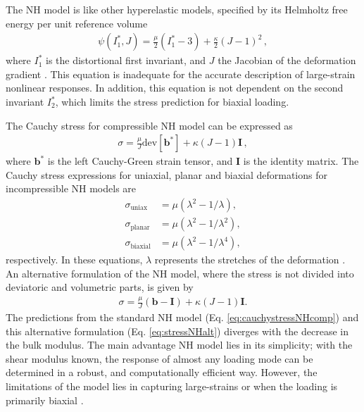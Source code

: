 The NH model is like other hyperelastic models, specified by its Helmholtz free energy per unit 
reference volume
\begin{align}
        \psi(I_1^*,J) = \frac{\mu}{2}(I_1^* - 3) + \frac{\kappa}{2}(J - 1)^2 \, ,
        \label{eq:helmholtzNH}
\end{align}
where $I_1^*$ is the distortional first invariant, and $J$ the Jacobian of the deformation gradient \cite{Youssef2022}.
This equation is inadequate for the accurate description of large-strain nonlinear responses. 
In addition, this equation is not dependent on the second invariant $I_2^*$, which limits the 
stress prediction for biaxial loading.

The Cauchy stress for compressible NH model can be expressed as \cite{Youssef2022}
\begin{align}
        \sigma = \frac{\mu}{J}\text{dev}[\boldsymbol{b}^*] + \kappa(J-1)\boldsymbol{I} \, ,
        \label{eq:cauchystressNHcomp}
\end{align}
where $\boldsymbol{b}^*$ is the left Cauchy-Green strain tensor, and $\boldsymbol{I}$ is the identity matrix. 
The Cauchy stress expressions for uniaxial, planar and biaxial deformations for incompressible NH models are
\begin{align}
        \sigma_{\text{uniax}} &= \mu(\lambda^2 - 1/\lambda), \label{eq:uniaxNH} \\
        \sigma_{\text{planar}} &= \mu(\lambda^2 - 1/\lambda^2), \label{eq:planarNH} \\
        \sigma_{\text{biaxial}} &= \mu(\lambda^2 - 1/\lambda^4), \label{eq:biaxialNH}
\end{align}
respectively. In these equations, $\lambda$ represents the stretches of the deformation \cite{Youssef2022}.
An alternative formulation of the NH model, where the stress is not divided into deviatoric and volumetric 
parts, is given by
\begin{align}
        \sigma = \frac{\mu}{J}(\boldsymbol{b}-\boldsymbol{I}) + \kappa(J-1)\boldsymbol{I}. \label{eq:stressNHalt}
\end{align}
The predictions from the standard NH model (Eq. \ref{eq:cauchystressNHcomp}) and this alternative formulation 
(Eq. \ref{eq:stressNHalt}) diverges with the decrease in the bulk modulus.
The main advantage NH model lies in its simplicity; with the shear modulus known, the response of almost any loading 
mode can be determined in a robust, and computationally efficient way. However, the limitations of the model lies 
in capturing large-strains or when the loading is primarily biaxial \cite{Bergström2015}.\\

